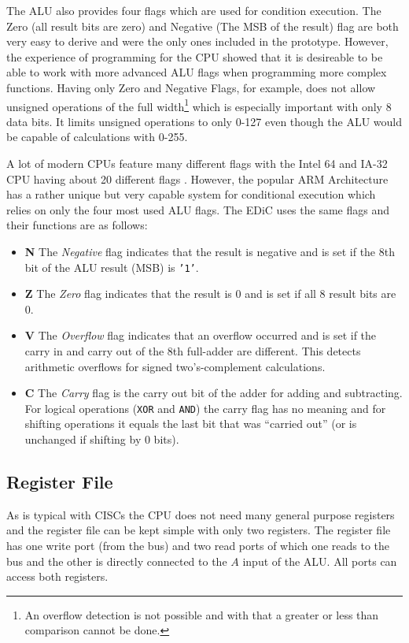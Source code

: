The \gls{ALU} also provides four flags which are used for condition execution.
The Zero (all result bits are zero) and Negative (The \gls{MSB} of the result) flag are both very easy to derive and were the only ones included in the prototype.
However, the experience of programming for the \gls{CPU} showed that it is desireable to be able to work with more advanced \gls{ALU} flags when programming more complex functions.
Having only Zero and Negative Flags, for example, does not allow unsigned operations of the full width\footnote{An overflow detection is not possible and with that a greater or less than comparison cannot be done.} which is especially important with only 8 data bits.
It limits unsigned operations to only 0-127 even though the \gls{ALU} would be capable of calculations with 0-255.

A lot of modern \glspl{CPU} feature many different flags with the Intel 64\textsuperscript{\textregistered} and IA-32 \gls{CPU} having about 20 different flags \cite[Section~3.4.3]{intelx86}.
However, the popular ARM Architecture has a rather unique but very capable system for conditional execution which relies on only the four most used \gls{ALU} flags.
The \gls{EDiC} uses the same flags and their functions are as follows:
\begin{itemize}
  \item \textbf{N} The \emph{Negative} flag indicates that the result is negative and is set if the 8th bit of the \gls{ALU} result (\gls{MSB}) is \texttt{'1'}.
  \item \textbf{Z} The \emph{Zero} flag indicates that the result is 0 and is set if all 8 result bits are 0.
  \item \textbf{V} The \emph{Overflow} flag indicates that an overflow occurred and is set if the carry in and carry out of the 8th full-adder are different.
  This detects arithmetic overflows for signed two's-complement calculations.
  \item \textbf{C} The \emph{Carry} flag is the carry out bit of the adder for adding and subtracting.
  For logical operations (\texttt{XOR} and \texttt{AND}) the carry flag has no meaning and for shifting operations it equals the last bit that was ``carried out'' (or is unchanged if shifting by 0 bits).
\end{itemize}
\subsection{Register File}\label{sec:regs}
As is typical with \glspl{CISC} the \gls{CPU} does not need many general purpose registers and the register file can be kept simple with only two registers.
The register file has one write port (from the bus) and two read ports of which one reads to the bus and the other is directly connected to the $A$ input of the \gls{ALU}.
All ports can access both registers.
